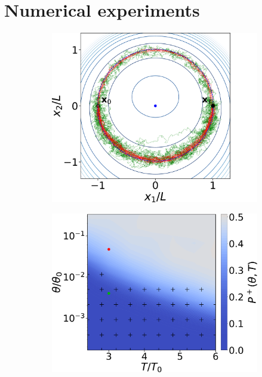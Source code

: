 \section{Numerical experiments}

\begin{figure} 
    \centering
     
    \begin{subfigure}[b]{0.31\textwidth}  
        \centering 
        \includegraphics[width=\textwidth]{figs_part1/mcmc/switch_trajectories_without_force}
        \caption[Straight Cosserat rod]%
        {}    
        \label{fig:straight cosserat rod}
    \end{subfigure}
    \hfill
    \begin{subfigure}[b]{0.33\textwidth}
        \centering
        \includegraphics[width=\textwidth]{figs_part1/mcmc/switch_channel_rates}

\end{subfigure}
\end{figure}
